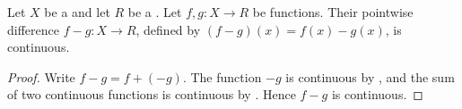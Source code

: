 \begin{proposition} \label{proposition:pointwise_difference_of_continuous_functions_on_a_topological_space_valued_in_topological_ring_is_continuous}
    Let $X$ be a  and let $R$ be a . Let $f,g : X \to R$ be  functions. Their pointwise difference $f - g : X \to R$, defined by $(f - g)(x) = f(x) - g(x)$, is continuous.
\end{proposition}
\begin{proof}
    Write $f - g = f + (-g)$. The function $-g$ is continuous by , and the sum of two continuous functions is continuous by . Hence $f - g$ is continuous.
\end{proof}